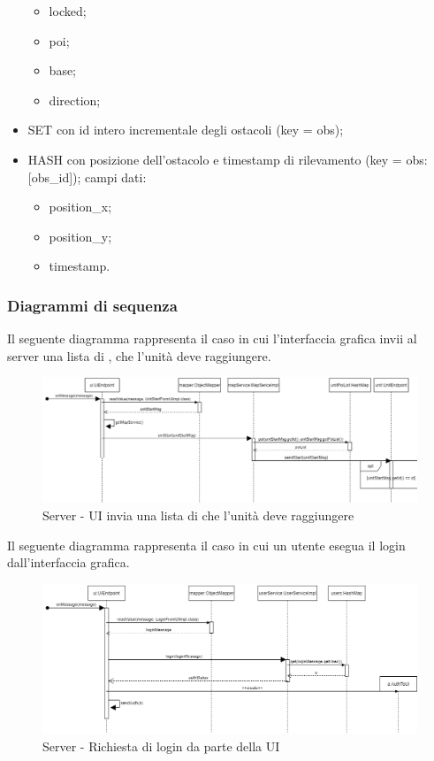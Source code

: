\begin{itemize}
\begin{itemize}
        \item locked;
        \item poi;
        \item base;
        \item direction;
    \end{itemize}
    \item SET con id intero incrementale degli ostacoli (key = obs);
    \item HASH con posizione dell’ostacolo e timestamp di rilevamento (key = obs:[obs\_id]); campi dati:
    \begin{itemize}
        \item position\_x;
        \item position\_y;
        \item timestamp.
    \end{itemize}
\end{itemize}

\subsubsection{Diagrammi di sequenza}
Il seguente diagramma rappresenta il caso in cui l'interfaccia grafica invii al server una lista di , che l'unità deve raggiungere.
\begin{figure}[H]
	\centering
	\includegraphics[width=16cm]{img/server_seq1.png}
	\caption{Server - UI invia una lista di  che l'unità deve raggiungere}
\end{figure}

\newpage
Il seguente diagramma rappresenta il caso in cui un utente esegua il login dall'interfaccia grafica.
\begin{figure}[H]
	\centering
	\includegraphics[width=16cm]{img/server_seq2.png}
	\caption{Server - Richiesta di login da parte della UI}
\end{figure}

